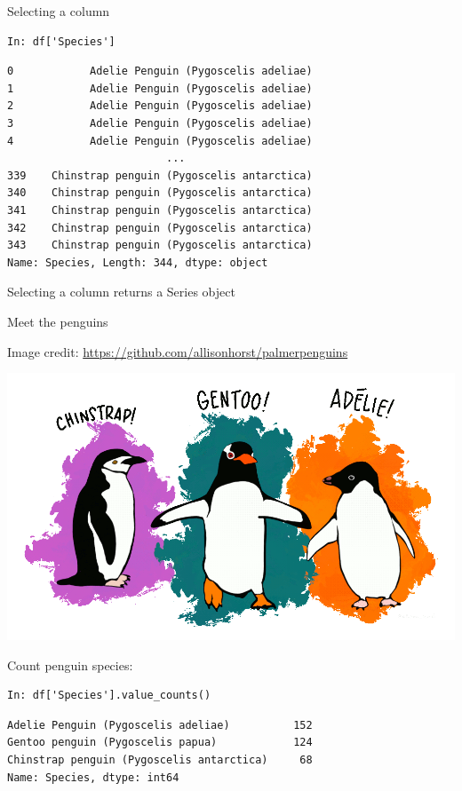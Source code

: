 \documentclass[aspectratio=169,usenames,dvipsnames]{beamer}
\begin{document}
\begin{frame}[fragile]{Selecting a column}
\begin{lstlisting}
In: df['Species']
\end{lstlisting}
\vspace{-1em}
\begin{lstlisting}[style=plain]
0            Adelie Penguin (Pygoscelis adeliae)
1            Adelie Penguin (Pygoscelis adeliae)
2            Adelie Penguin (Pygoscelis adeliae)
3            Adelie Penguin (Pygoscelis adeliae)
4            Adelie Penguin (Pygoscelis adeliae)
                         ...                    
339    Chinstrap penguin (Pygoscelis antarctica)
340    Chinstrap penguin (Pygoscelis antarctica)
341    Chinstrap penguin (Pygoscelis antarctica)
342    Chinstrap penguin (Pygoscelis antarctica)
343    Chinstrap penguin (Pygoscelis antarctica)
Name: Species, Length: 344, dtype: object
\end{lstlisting}

Selecting a column returns a Series object
\end{frame}


\begin{frame}[fragile]{Meet the penguins}
\begin{reference}
Image credit: \url{https://github.com/allisonhorst/palmerpenguins}
\end{reference}
\includegraphics[height=0.4\textheight]{fig/lter_penguins}

Count penguin species:
\begin{lstlisting}
In: df['Species'].value_counts()
\end{lstlisting}
\vspace{-1em}
\begin{lstlisting}[style=plain]
Adelie Penguin (Pygoscelis adeliae)          152
Gentoo penguin (Pygoscelis papua)            124
Chinstrap penguin (Pygoscelis antarctica)     68
Name: Species, dtype: int64
\end{lstlisting}

\end{frame}
\end{document}
